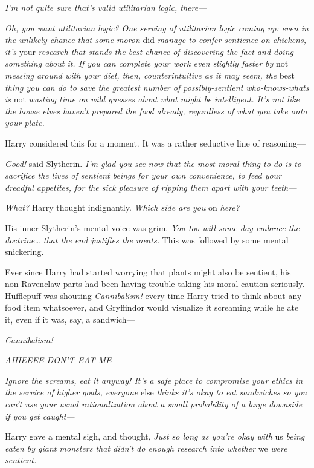 \emph{I'm not quite sure that's valid utilitarian logic, there---}

\emph{Oh, you want utilitarian logic? One serving of utilitarian logic coming
up: even in the unlikely chance that some moron} did \emph{manage to confer
sentience on chickens, it's} your \emph{research that stands the best chance of
discovering the fact and doing something about it. If you can complete your
work even slightly faster by} not \emph{messing around with your diet, then,
counterintuitive as it may seem, the} best \emph{thing you can do to save the
greatest number of possibly-sentient who-knows-whats is} not \emph{wasting time
on wild guesses about what might be intelligent. It's not like the house elves
haven't prepared the food already, regardless of what you take onto your plate.}

Harry considered this for a moment. It was a rather seductive line of
reasoning---

\emph{Good!} said Slytherin. \emph{I'm glad you see now that the most moral
thing to do is to sacrifice the lives of sentient beings for your own
convenience, to feed your dreadful appetites, for the sick pleasure of ripping
them apart with your teeth---}

\emph{What?} Harry thought indignantly. \emph{Which side are you} on \emph{here?}

His inner Slytherin's mental voice was grim. \emph{You too will some day embrace
the doctrine{\ldots} that the end justifies the meats.} This was followed by
some mental snickering.

Ever since Harry had started worrying that plants might also be sentient, his
non-Ravenclaw parts had been having trouble taking his moral caution
seriously. Hufflepuff was shouting \emph{Cannibalism!} every time Harry tried
to think about any food item whatsoever, and Gryffindor would visualize it
screaming while he ate it, even if it was, say, a sandwich---

\emph{Cannibalism!}

\emph{AIIIEEEE DON'T EAT ME---}

\emph{Ignore the screams, eat it anyway! It's a safe place to compromise your
ethics in the service of higher goals, everyone} else \emph{thinks it's okay to
eat sandwiches so you can't use your usual rationalization about a small
probability of a large downside if you get caught---}

Harry gave a mental sigh, and thought, \emph{Just so long as you're okay with}
us \emph{being eaten by giant monsters that didn't do enough research into
whether} we \emph{were sentient.}

